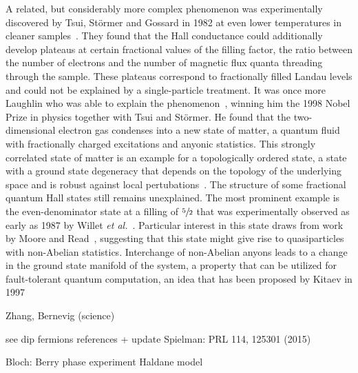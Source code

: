 A related, but considerably more complex phenomenon was experimentally discovered by Tsui, Störmer and Gossard in 1982 at even lower temperatures in cleaner samples~\cite{Tsui1982}.
They found that the Hall conductance could additionally develop plateaus at certain fractional values of the filling factor, the ratio between the number of electrons and the number of magnetic flux quanta threading through the sample.
These plateaus correspond to fractionally filled Landau levels and could not be explained by a single-particle treatment.
It was once more Laughlin who was able to explain the phenomenon~\cite{Laughlin1983}, winning him the 1998 Nobel Prize in physics together with Tsui and Störmer.
He found that the two-dimensional electron gas condenses into a new state of matter, a quantum fluid with fractionally charged excitations and anyonic statistics.
This strongly correlated state of matter is an example for a topologically ordered state, a state with a ground state degeneracy that depends on the topology of the underlying space and is robust against local pertubations~\cite{Wen1990,Wen1995}.
The structure of some fractional quantum Hall states still remains unexplained. The most prominent example is the even-denominator state at a filling of $\sfrac{5}{2}$ that was experimentally observed as early as 1987 by Willet \emph{et al.}~\cite{Willett1987}.
Particular interest in this state draws from work by Moore and Read~\cite{Moore1991}, suggesting that this state might give rise to quasiparticles with non-Abelian statistics.
Interchange of non-Abelian anyons leads to a change in the ground state manifold of the system, a property that can be utilized for fault-tolerant quantum computation, an idea that has been proposed by Kitaev in 1997~\cite{Kitaev2003}

\cite{Haldane1988}

\cite{Kane2005a,Kane2005,Hasan2010}

Zhang, Bernevig (science)



see dip fermions references + update
Spielman: PRL 114, 125301 (2015)

\cite{Aidelsburger2011,Aidelsburger2013,Miyake2013}

Bloch: Berry phase experiment
Haldane model \cite{Jotzu2014}




